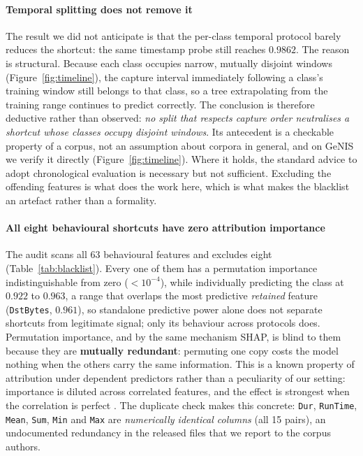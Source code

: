 \documentclass[review,12pt]{elsarticle}
\begin{document}
\paragraph{Temporal splitting does not remove it}
The result we did not anticipate is that the per-class temporal protocol barely reduces
the shortcut: the same timestamp probe still reaches $0.9862$. The reason is structural.
Because each class occupies narrow, mutually disjoint windows
(Figure~\ref{fig:timeline}), the capture interval immediately following a class's
training window still belongs to that class, so a tree extrapolating from the training
range continues to predict correctly. The conclusion is therefore deductive rather than
observed: \emph{no split that respects capture order neutralises a shortcut whose classes
occupy disjoint windows}. Its antecedent is a checkable property of a corpus, not an
assumption about corpora in general, and on GeNIS we verify it directly
(Figure~\ref{fig:timeline}). Where it holds, the standard advice to adopt chronological
evaluation \cite{pendlebury2019tesseract} is necessary but not sufficient. Excluding the offending features
is what does the work here, which is what makes the blacklist an artefact rather than a
formality.

\paragraph{All eight behavioural shortcuts have zero attribution importance}
The audit scans all 63 behavioural features and excludes eight
(Table~\ref{tab:blacklist}). Every one of them has a permutation importance
indistinguishable from zero ($<10^{-4}$), while individually predicting the class at
$0.922$ to $0.963$, a range that overlaps the most predictive \emph{retained} feature
(\texttt{DstBytes}, $0.961$), so standalone predictive power alone does not separate
shortcuts from legitimate signal; only its behaviour across protocols does. Permutation
importance, and by the same mechanism SHAP, is blind to them because they are
\textbf{mutually redundant}: permuting one copy costs the model nothing when the others
carry the same information. This is a known property of attribution under dependent
predictors rather than a peculiarity of our setting: importance is diluted across
correlated features, and the effect is strongest when the correlation is perfect
\cite{strobl2008conditional,hooker2021unrestricted}. The duplicate check makes this concrete: \texttt{Dur}, \texttt{RunTime},
\texttt{Mean}, \texttt{Sum}, \texttt{Min} and \texttt{Max} are \emph{numerically identical
columns} (all 15 pairs), an undocumented redundancy in the released files that we report
to the corpus authors.
\end{document}
